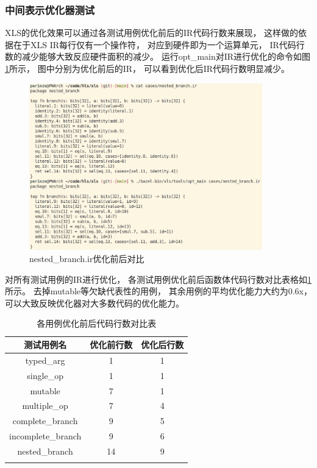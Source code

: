 \subsubsection{中间表示优化器测试}

XLS的优化效果可以通过各测试用例优化前后的IR代码行数来展现，
这样做的依据在于XLS IR每行仅有一个操作符，
对应到硬件即为一个运算单元，
IR代码行数的减少能够大致反应硬件面积的减少。
运行opt\_main对IR进行优化的命令如图\ref{fig.7}所示，
图中分别为优化前后的IR，
可以看到优化后IR代码行数明显减少。

\begin{figure}[h]
\centering
\includegraphics[width=0.9\textwidth]{figure/opt_command.png}
\caption{nested\_branch.ir优化前后对比}
\label{fig.7}
\end{figure}

对所有测试用例的IR进行优化，
各测试用例优化前后函数体代码行数对比表格如\ref{table.7}所示。
去掉mutable等欠缺代表性的用例，
其余用例的平均优化能力大约为0.6x，
可以大致反映优化器对大多数代码的优化能力。

\begin{table}[ht]
\begin{center}
\caption{各用例优化前后代码行数对比表}

\begin{tabular}{ c c c }
    \Xhline{3\arrayrulewidth}
    测试用例名             & 优化前行数 & 优化后行数\\
    \hline
    typed\_arg            & 1  & 1 \\
    single\_op            & 1  & 1 \\
    mutable               & 7  & 1 \\
    multiple\_op          & 7  & 4 \\
    complete\_branch      & 9  & 5 \\
    incomplete\_branch    & 9  & 6 \\
    nested\_branch        & 14 & 9 \\
    \Xhline{3\arrayrulewidth}
\end{tabular}

\label{table.7}
\end{center}
\end{table}

